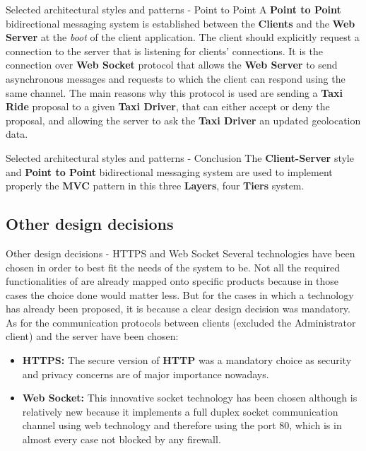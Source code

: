 \documentclass{../common/latex_classes/pdf_presentation}
\newcommand{\itemBold}[1]{\item\textbf{#1:}}
\begin{document}
	\begin{frame}{Selected architectural styles and patterns - Point to Point}
		A \textbf{Point to Point} bidirectional messaging system is established between the \textbf{Clients} and the \textbf{Web Server} at the \textit{boot} of the client application.
		The client should explicitly request a connection to the server that is listening for clients' connections.
		It is the connection over \textbf{Web Socket} protocol that allows the \textbf{Web Server} to send asynchronous messages and requests to which the client can respond using the same channel.
		The main reasons why this protocol is used are sending a \textbf{Taxi Ride} proposal to a given \textbf{Taxi Driver}, that can either accept or deny the proposal, and allowing the server to ask the \textbf{Taxi Driver} an updated geolocation data.
	\end{frame}
	
	\begin{frame}{Selected architectural styles and patterns - Conclusion}
		The \textbf{Client-Server} style and \textbf{Point to Point} bidirectional messaging system are used to implement properly the \textbf{MVC} pattern in this three \textbf{Layers}, four \textbf{Tiers} system.
	\end{frame}
	
	\subsection{Other design decisions}
		
	\begin{frame}{Other design decisions - HTTPS and Web Socket}
		Several technologies have been chosen in order to best fit the needs of the system to be.
		Not all the required functionalities of \myTaxiService{} are already mapped onto specific products because in those cases the choice done would matter less.
		But for the cases in which a technology has already been proposed, it is because a clear design decision was mandatory.
		As for the communication protocols between clients (excluded the Administrator client) and the server have been chosen:
		\begin{itemize}
			\itemBold{HTTPS} The secure version of \textbf{HTTP} was a mandatory choice as security and privacy concerns are of major importance nowadays.
			\itemBold{Web Socket} This innovative socket technology has been chosen although is relatively new because it implements a full duplex socket communication channel using web technology and therefore using the port 80, which is in almost every case not blocked by any firewall.
		\end{itemize}
	\end{frame}
	
\end{document}
